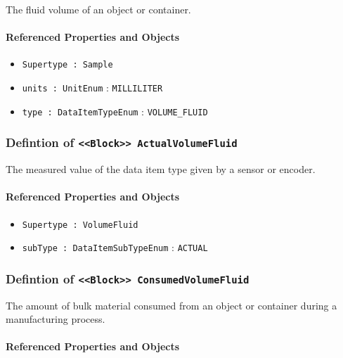 \FloatBarrier

The fluid volume of an object or container.

\FloatBarrier
\paragraph{Referenced Properties and Objects}

\begin{itemize}
\item \texttt{Supertype : Sample}

\item \texttt{units : UnitEnum} : \texttt{MILLILITER}

\item \texttt{type : DataItemTypeEnum} : \texttt{VOLUME_FLUID}

\end{itemize}
\FloatBarrier
\subsubsection{Defintion of \texttt{<<Block>> ActualVolumeFluid}}
  \label{type:ActualVolumeFluid}

\FloatBarrier

The measured value of the data item type given by a sensor or encoder.

\FloatBarrier
\paragraph{Referenced Properties and Objects}

\begin{itemize}
\item \texttt{Supertype : VolumeFluid}

\item \texttt{subType : DataItemSubTypeEnum} : \texttt{ACTUAL}

\end{itemize}
\FloatBarrier
\subsubsection{Defintion of \texttt{<<Block>> ConsumedVolumeFluid}}
  \label{type:ConsumedVolumeFluid}

\FloatBarrier

The amount of bulk material consumed from an object or container during a manufacturing process.

\FloatBarrier
\paragraph{Referenced Properties and Objects}

